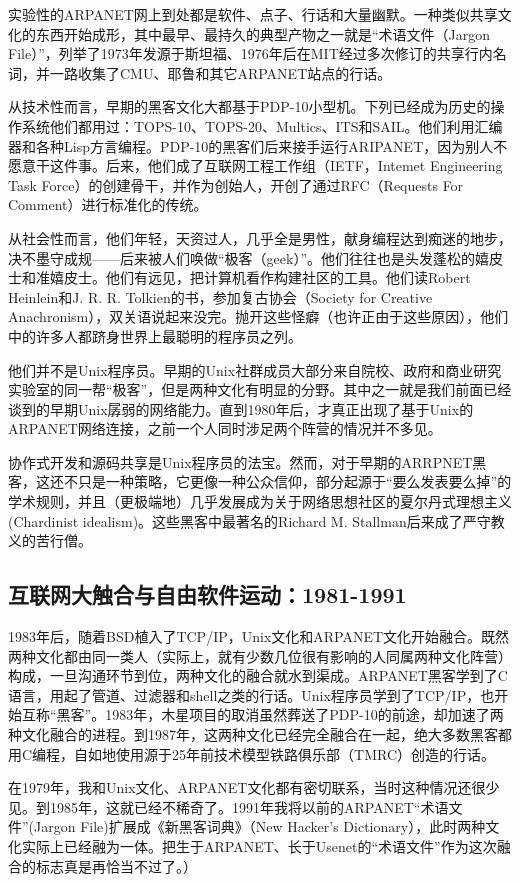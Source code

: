 \documentclass[12pt,oneside]{book}
\begin{document}
\begin{common-format}
实验性的ARPANET网上到处都是软件、点子、行话和大量幽默。一种类似共享文化的东西开始成形，其中最早、最持久的典型产物之一就是“术语文件（Jargon File）”，列举了1973年发源于斯坦福、1976年后在MIT经过多次修订的共享行内名词，并一路收集了CMU、耶鲁和其它ARPANET站点的行话。

从技术性而言，早期的黑客文化大都基于PDP-10小型机。下列已经成为历史的操作系统他们都用过：TOPS-10、TOPS-20、Multics、ITS和SAIL。他们利用汇编器和各种Lisp方言编程。PDP-10的黑客们后来接手运行ARIPANET，因为别人不愿意干这件事。后来，他们成了互联网工程工作组（IETF，Intemet Engineering Task Force）的创建骨干，并作为创始人，开创了通过RFC（Requests For Comment）进行标准化的传统。

从社会性而言，他们年轻，天资过人，几乎全是男性，献身编程达到痴迷的地步，决不墨守成规——后来被人们唤做“极客（geek）”。他们往往也是头发蓬松的嬉皮士和准嬉皮士。他们有远见，把计算机看作构建社区的工具。他们读Robert Heinlein和J. R. R. Tolkien的书，参加复古协会（Society for Creative Anachronism），双关语说起来没完。抛开这些怪癖（也许正由于这些原因），他们中的许多人都跻身世界上最聪明的程序员之列。

他们并不是Unix程序员。早期的Unix社群成员大部分来自院校、政府和商业研究实验室的同一帮“极客”，但是两种文化有明显的分野。其中之一就是我们前面已经谈到的早期Unix孱弱的网络能力。直到1980年后，才真正出现了基于Unix的ARPANET网络连接，之前一个人同时涉足两个阵营的情况并不多见。

协作式开发和源码共享是Unix程序员的法宝。然而，对于早期的ARRPNET黑客，这还不只是一种策略，它更像一种公众信仰，部分起源于“要么发表要么掉”的学术规则，并且（更极端地）几乎发展成为关于网络思想社区的夏尔丹式理想主义(Chardinist idealism)。这些黑客中最著名的Richard M. Stallman后来成了严守教义的苦行僧。

\subsection{互联网大触合与自由软件运动：1981-1991}
1983年后，随着BSD植入了TCP/IP，Unix文化和ARPANET文化开始融合。既然两种文化都由同一类人（实际上，就有少数几位很有影响的人同属两种文化阵营）构成，一旦沟通环节到位，两种文化的融合就水到渠成。ARPANET黑客学到了C语言，用起了管道、过滤器和shell之类的行话。Unix程序员学到了TCP/IP，也开始互称“黑客”。1983年，木星项目的取消虽然葬送了PDP-10的前途，却加速了两种文化融合的进程。到1987年，这两种文化已经完全融合在一起，绝大多数黑客都用C编程，自如地使用源于25年前技术模型铁路俱乐部（TMRC）创造的行话。

在1979年，我和Unix文化、ARPANET文化都有密切联系，当时这种情况还很少见。到1985年，这就已经不稀奇了。1991年我将以前的ARPANET“术语文件”(Jargon File)扩展成《新黑客词典》（New Hacker's Dictionary）\cite{Raymond96}，此时两种文化实际上已经融为一体。把生于ARPANET、长于Usenet的“术语文件”作为这次融合的标志真是再恰当不过了。）


\end{common-format}
\end{document}
